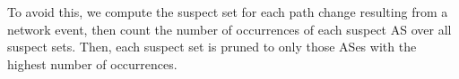 To avoid this, we compute the suspect set for each path change resulting
from a network event, then count the number of occurrences of each
suspect AS over all suspect sets.  Then, each suspect set is pruned to
only those ASes with the highest number of occurrences.

